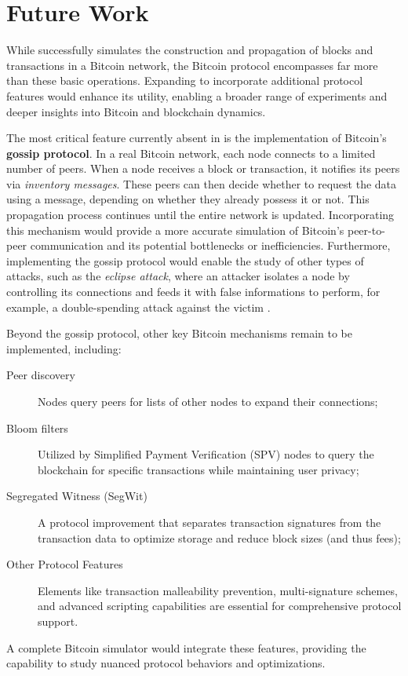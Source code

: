 \chapter{Future Work}\label{ch:next}

While \iblock{} successfully simulates the construction and propagation of
blocks and transactions in a Bitcoin network, the Bitcoin protocol encompasses
far more than these basic operations. Expanding \iblock{} to incorporate
additional protocol features would enhance its utility, enabling a broader
range of experiments and deeper insights into Bitcoin and blockchain dynamics.

The most critical feature currently absent in \iblock{} is the implementation
of Bitcoin's \textbf{gossip protocol}. In a real Bitcoin network, each node
connects to a limited number of peers. When a node receives a block or
transaction, it notifies its peers via \emph{inventory messages}. These peers
can then decide whether to request the data using a  message,
depending on whether they already possess it or not. This propagation process
continues until the entire network is updated. Incorporating this mechanism
would provide a more accurate simulation of Bitcoin's peer-to-peer
communication and its potential bottlenecks or inefficiencies. Furthermore,
implementing the gossip protocol would enable the study of other types of
attacks, such as the \emph{eclipse attack}, where an attacker isolates a node
by controlling its connections and feeds it with false informations to perform,
for example, a double-spending attack against the victim \cite{eclipse}.

Beyond the gossip protocol, other key Bitcoin mechanisms remain to be
implemented, including:
\begin{description}
	\item[Peer discovery] Nodes query peers for lists of other nodes to
		expand their connections;
	\item[Bloom filters] Utilized by Simplified Payment Verification (SPV)
		nodes to query the blockchain for specific transactions while
		maintaining user privacy;
	\item[Segregated Witness (SegWit)] A protocol improvement that
		separates transaction signatures from the transaction data to
		optimize storage and reduce block sizes (and thus fees);
	\item[Other Protocol Features] Elements like transaction malleability
		prevention, multi-signature schemes, and advanced scripting
		capabilities are essential for comprehensive protocol support.
\end{description}
A complete Bitcoin simulator would integrate these features, providing the
capability to study nuanced protocol behaviors and optimizations.

